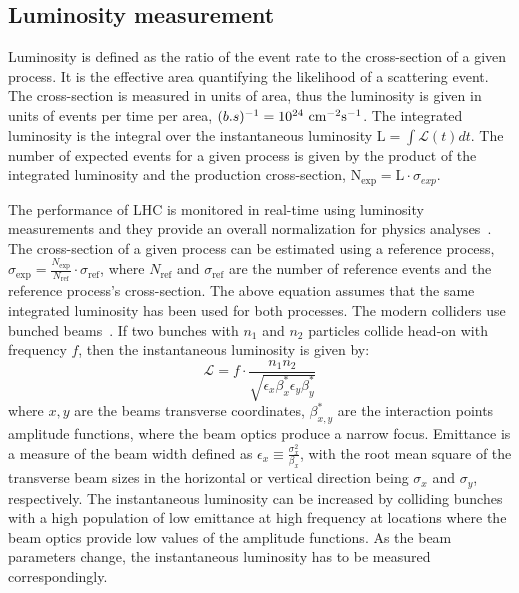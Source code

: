 \subsection{Luminosity measurement}

Luminosity is defined as the ratio of the event rate to the cross-section of a given process. It is the effective area quantifying the likelihood of a scattering event. The cross-section is measured in units of area, thus the luminosity is given in units of events per time per area, $(b.s)^{-1} = 10^{24}~\text{cm}^{-2}\text{s}^{-1}$. The integrated luminosity is the integral over the instantaneous luminosity $\text{L}=\int \mathcal{L}(t) dt$. The number of expected events for a given process is given by the product of the integrated luminosity and the production cross-section, $\mathrm{N_{exp}}=\text{L} \cdot \sigma_{exp}$.

The performance of LHC is monitored in real-time using luminosity measurements and they provide an overall normalization for physics analyses~\cite{Bayatian:2006nff}. The cross-section of a given process can be estimated using a reference process, $\sigma_{\exp} = \frac{N_{\exp}}{N_{\text{ref}}} \cdot \sigma_{\text{ref}}$, where $N_{\text{ref}}$ and $\sigma_{\text{ref}}$ are the number of reference events and the reference process's cross-section. The above equation assumes that the same integrated luminosity has been used for both processes. The modern colliders use bunched beams~\cite{Tanabashi:2018oca}. If two bunches with $n_1$ and $n_2$ particles collide head-on with frequency $f$, then the instantaneous luminosity is given by:
%
\begin{equation}
  \mathcal{L}=f \cdot \frac{n_{1} n_{2}}{\sqrt{\epsilon_{x} \beta_{x}^{*} \epsilon_{y} \beta_{y}^{*}}}
\end{equation}
%
where ${x,y}$ are the beams transverse coordinates, $\beta^*_{x,y}$ are the interaction points amplitude functions, where the beam optics produce a narrow focus. Emittance is a measure of the beam width defined as $\epsilon_{x} \equiv \frac{\sigma_{x}^{2}}{\beta_{x}}$, with the root mean square of the transverse beam sizes in the horizontal or vertical direction being $\sigma_{x}$ and $\sigma_{y}$, respectively. The instantaneous luminosity can be increased by colliding bunches with a high population of low emittance at high frequency at locations where the beam optics provide low values of the amplitude functions. As the beam parameters change, the instantaneous luminosity has to be measured correspondingly.

